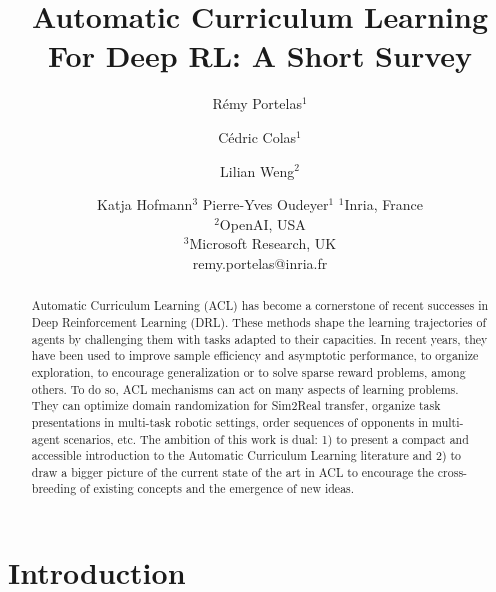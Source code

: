 \documentclass{article}
\title{Automatic Curriculum Learning For Deep RL: A Short Survey}
\author{
R\'emy Portelas$^1$
\and
C\'edric Colas$^1$\and
Lilian Weng$^2$\and
Katja Hofmann$^3$\And
Pierre-Yves Oudeyer$^1$
\affiliations
$^1$Inria, France\\
$^2$OpenAI, USA\\
$^3$Microsoft Research, UK\\
\vspace{0.12cm}
remy.portelas@inria.fr}
\begin{document}
\maketitle

\begin{abstract}
    Automatic Curriculum Learning (ACL) has become a cornerstone of recent successes in Deep Reinforcement Learning (DRL). 
    These methods shape the learning trajectories of agents by challenging them with tasks adapted to their capacities.
    In recent years, they have been used to improve sample efficiency and asymptotic performance, to organize exploration, to encourage generalization or to solve sparse reward problems, among others.
    To do so, ACL mechanisms can act on many aspects of learning problems. 
    They can optimize domain randomization for Sim2Real transfer, organize task presentations in multi-task robotic settings, order sequences of opponents in multi-agent scenarios, etc.
    The ambition of this work is dual: 1) to present a compact and accessible introduction to the Automatic Curriculum Learning literature and 2) to draw a bigger picture of the current state of the art in ACL to encourage the cross-breeding of existing concepts and the emergence of new ideas.   
\end{abstract}


\section{Introduction}

\end{document}
